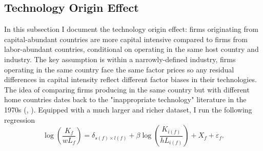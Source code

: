 \documentclass[notitlepage,11pt]{article}%
\begin{document}
\subsection{Technology Origin Effect}

In this subsection I document the technology origin effect: firms originating
from capital-abundant countries are more capital intensive compared to firms
from labor-abundant countries, conditional on operating in the same host
country and industry. The key assumption is within a narrowly-defined
industry, firms operating in the same country face the same factor prices so
any residual differences in capital intensity reflect different factor biases
in their technologies. The idea of comparing firms producing in the same
country but with different home countries dates back to the "inappropriate
technology" literature in the 1970s (\cite{mason_observations_1973},
\cite{morley_limited_1977}). Equipped with a much larger and richer dataset, I
run the following regression%
\[
\log\left(  \frac{K_{f}}{wL_{f}}\right)  =\delta_{s\left(  f\right)  \times
l\left(  f\right)  }+\beta\log\left(  \frac{K_{i\left(  f\right)  }%
}{hL_{i\left(  f\right)  }}\right)  +X_{f}+\varepsilon_{f}.
\]
\end{document}
